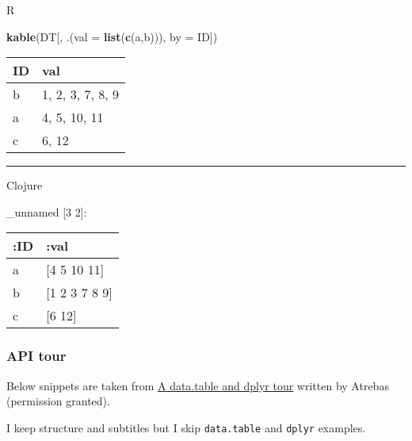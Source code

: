 \documentclass[]{article}
\newenvironment{Shaded}{\begin{snugshade}}{\end{snugshade}}
\newcommand{\AttributeTok}[1]{\textcolor[rgb]{0.77,0.63,0.00}{#1}}
\newcommand{\DataTypeTok}[1]{\textcolor[rgb]{0.13,0.29,0.53}{#1}}
\newcommand{\KeywordTok}[1]{\textcolor[rgb]{0.13,0.29,0.53}{\textbf{#1}}}
\newcommand{\NormalTok}[1]{#1}
\begin{document}
R

\begin{Shaded}
\begin{Highlighting}[]
\KeywordTok{kable}\NormalTok{(DT[, .(}\DataTypeTok{val =} \KeywordTok{list}\NormalTok{(}\KeywordTok{c}\NormalTok{(a,b))), }\DataTypeTok{by =}\NormalTok{ ID])}
\end{Highlighting}
\end{Shaded}

\begin{longtable}[]{@{}ll@{}}
\toprule
ID & val\tabularnewline
\midrule
\endhead
b & 1, 2, 3, 7, 8, 9\tabularnewline
a & 4, 5, 10, 11\tabularnewline
c & 6, 12\tabularnewline
\bottomrule
\end{longtable}

\begin{center}\rule{0.5\linewidth}{0.5pt}\end{center}

Clojure

\begin{Shaded}
\end{Shaded}

\_unnamed {[}3 2{]}:

\begin{longtable}[]{@{}ll@{}}
\toprule
:ID & :val\tabularnewline
\midrule
\endhead
a & {[}4 5 10 11{]}\tabularnewline
b & {[}1 2 3 7 8 9{]}\tabularnewline
c & {[}6 12{]}\tabularnewline
\bottomrule
\end{longtable}

\hypertarget{api-tour}{%
\subsubsection{API tour}\label{api-tour}}

Below snippets are taken from
\href{https://atrebas.github.io/post/2019-03-03-datatable-dplyr/}{A
data.table and dplyr tour} written by Atrebas (permission granted).

I keep structure and subtitles but I skip \texttt{data.table} and
\texttt{dplyr} examples.
\end{document}
